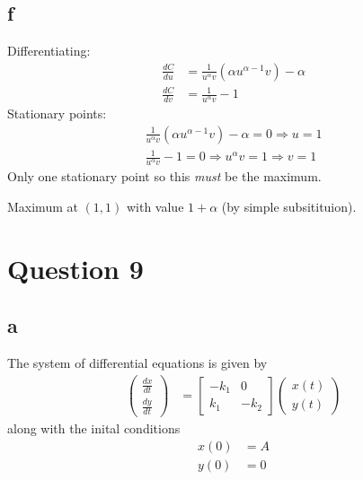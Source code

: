 \documentclass{unswmaths}
\begin{document}
\subsection*{f}
    Differentiating:
    \begin{align*}
        \frac{dC}{du} &= \frac{1}{u^\alpha v} ( \alpha u^{\alpha-1} v ) - \alpha \\
        \frac{dC}{dv} &= \frac{1}{u^\alpha v} - 1
    \end{align*}
    Stationary points:
    \begin{align*}
        \frac{1}{u^\alpha v} ( \alpha u^{\alpha-1} v ) - \alpha = 0 \Longrightarrow u = 1 \\
        \frac{1}{u^\alpha v} - 1 = 0 \Longrightarrow u^\alpha v = 1 \Longrightarrow v = 1
    \end{align*}
    Only one stationary point so this \emph{must} be the maximum. 
    
    Maximum at $ (1,1) $ with value $ 1 + \alpha $ (by simple subsitituion).
\section*{Question 9}
\subsection*{a}
The system of differential equations is given by
\begin{align*}
    \left( \begin{array}{c} \frac{dx}{dt} \\ \frac{dy}{dt} \end{array}\right) &= \left[ \begin{array}{cc} -k_1 & 0 \\ k_1 & -k_2 \end{array} \right] \left( \begin{array}{c} x(t) \\ y(t) \end{array}\right)
\end{align*}
along with the inital conditions
\begin{align*}
    x(0) &= A \\
    y(0) &= 0 
\end{align*}
\end{document}
